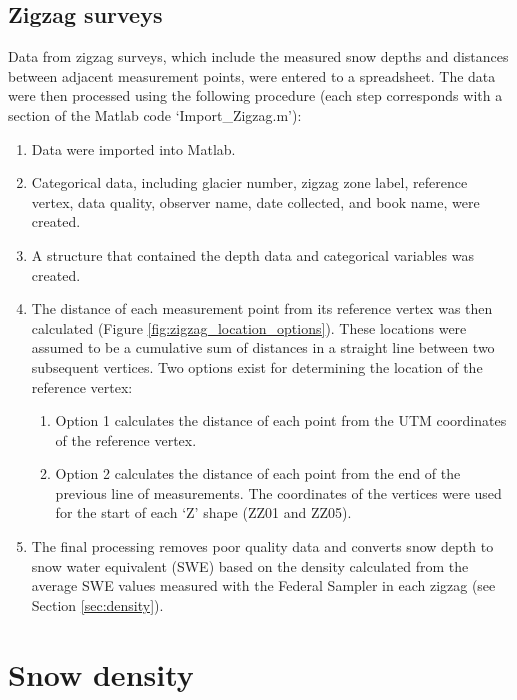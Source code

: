 \documentclass{sfuthesis}
\begin{document}
\begin{appendices}
\subsection{Zigzag surveys}

Data from zigzag surveys, which include the measured snow depths and distances between adjacent measurement points, were entered to a spreadsheet. The data were then processed using the following procedure (each step corresponds with a section of the Matlab code `Import\_Zigzag.m'):
\begin{enumerate}
\item Data were imported into Matlab.
\item Categorical data, including glacier number, zigzag zone label, reference vertex, data quality, observer name, date collected, and book name, were created.
\item A structure that contained the depth data and categorical variables was created.
\item The distance of each measurement point from its reference vertex was then calculated (Figure \ref{fig:zigzag_location_options}). These locations were assumed to be a cumulative sum of distances in a straight line between two subsequent vertices. Two options exist for determining the location of the reference vertex:
 	\begin{enumerate}
	\item Option 1 calculates the distance of each point from the UTM coordinates of the reference vertex.
	\item Option 2 calculates the distance of each point from the end of the previous line of measurements. The coordinates of the vertices were used for the start of each `Z' shape (ZZ01 and ZZ05).
	\end{enumerate}
\item The final processing removes poor quality data and converts snow depth to snow water equivalent (SWE) based on the density calculated from the average SWE values measured with the Federal Sampler in each zigzag (see Section \ref{sec:density}).
\end{enumerate}

\section{Snow density}


\end{appendices}
\end{document}
